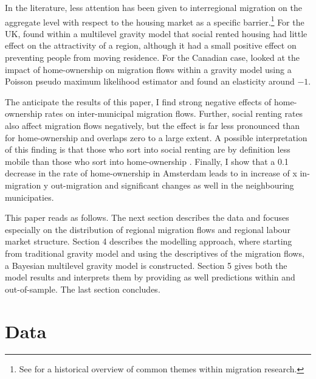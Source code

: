 \documentclass[fleqn,10pt]{SelfArx} %
\begin{document}
        In the literature, less attention has been given to interregional
        migration on the aggregate level with respect to the housing market as a
        specific barrier.\footnote{See \citet{cushing2004crossing} for a
          historical overview of common themes within migration research.} For
        the UK, \citet{congdon2010random} found within a multilevel gravity
        model that social rented housing had little effect on the attractivity
        of a region, although it had a small positive effect on preventing
        people from moving residence. For the Canadian case,
        \citet{amirault2016drags} looked at the impact of home-ownership on
        migration flows within a gravity model using a Poisson pseudo maximum
        likelihood estimator and found an elasticity around $-1$.

        The anticipate the results of this paper, I find strong negative effects
        of home-ownership rates on inter-municipal migration flows. Further,
        social renting rates also affect migration flows negatively, but the
        effect is far less pronounced than for home-ownership and overlaps zero
        to a large extent. A possible interpretation of this finding is that
        those who sort into social renting are by definition less mobile than
        those who sort into home-ownership \citep[this argument is put forward
        by][as well]{boyle1998migration}. Finally, I show that a 0.1 decrease in
        the rate of home-ownership in Amsterdam leads to in increase of x
        in-migration y out-migration and significant changes as well in the
        neighbouring municipaties.

        This paper reads as follows. The next section describes the data and
        focuses especially on the distribution of regional migration flows and
        regional labour market structure. Section 4 describes the modelling
        approach, where starting from traditional gravity model and using the
        descriptives of the migration flows, a Bayesian multilevel gravity model
        is constructed. Section 5 gives both the model results and interprets
        them by providing as well predictions within and out-of-sample. The last
        section concludes.
        
        \section{Data}
\end{document}
